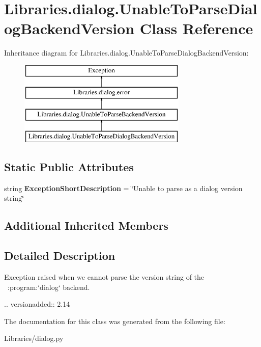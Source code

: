 \hypertarget{class_libraries_1_1dialog_1_1_unable_to_parse_dialog_backend_version}{}\section{Libraries.\+dialog.\+Unable\+To\+Parse\+Dialog\+Backend\+Version Class Reference}
\label{class_libraries_1_1dialog_1_1_unable_to_parse_dialog_backend_version}
Inheritance diagram for Libraries.\+dialog.\+Unable\+To\+Parse\+Dialog\+Backend\+Version\+:\begin{figure}[H]
\begin{center}
\leavevmode
\includegraphics[height=4.000000cm]{class_libraries_1_1dialog_1_1_unable_to_parse_dialog_backend_version}
\end{center}
\end{figure}
\subsection*{Static Public Attributes}
\begin{DoxyCompactItemize}
\item 
string {\bfseries Exception\+Short\+Description} = \char`\"{}Unable to parse as a dialog version string\char`\"{}\hypertarget{class_libraries_1_1dialog_1_1_unable_to_parse_dialog_backend_version_a4059e9d3a8b9fa9b43386ce2351469f9}{}\label{class_libraries_1_1dialog_1_1_unable_to_parse_dialog_backend_version_a4059e9d3a8b9fa9b43386ce2351469f9}

\end{DoxyCompactItemize}
\subsection*{Additional Inherited Members}


\subsection{Detailed Description}
\begin{DoxyVerb}Exception raised when we cannot parse the version string of the \
:program:`dialog` backend.

.. versionadded:: 2.14
\end{DoxyVerb}
 

The documentation for this class was generated from the following file\+:\begin{DoxyCompactItemize}
\item 
Libraries/dialog.\+py\end{DoxyCompactItemize}
